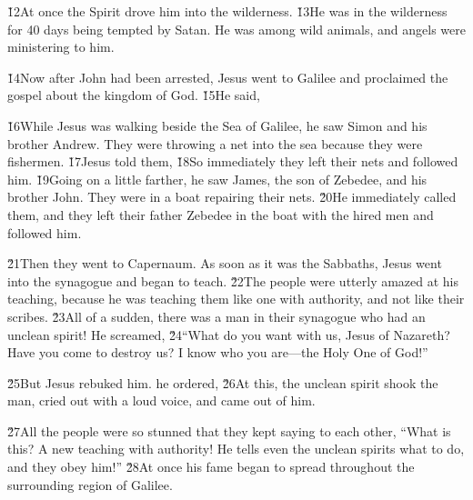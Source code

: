 \v{12}At once the Spirit drove him into the wilderness. \v{13}He was in the wilderness for 40 days being tempted by Satan. He was among wild animals, and angels were ministering to him.

\v{14}Now after John had been arrested, Jesus went to Galilee and proclaimed the gospel about the kingdom of God. \v{15}He said, 

\v{16}While Jesus was walking beside the Sea of Galilee, he saw Simon and his brother Andrew. They were throwing a net into the sea because they were fishermen. \v{17}Jesus told them,  \v{18}So immediately they left their nets and followed him. \v{19}Going on a little farther, he saw James, the son of Zebedee, and his brother John. They were in a boat repairing their nets. \v{20}He immediately called them, and they left their father Zebedee in the boat with the hired men and followed him.

\v{21}Then they went to Capernaum. As soon as it was the Sabbaths, Jesus went into the synagogue and began to teach. \v{22}The people were utterly amazed at his teaching, because he was teaching them like one with authority, and not like their scribes. \v{23}All of a sudden, there was a man in their synagogue who had an unclean spirit! He screamed, \v{24}``What do you want with us, Jesus of Nazareth? Have you come to destroy us? I know who you are---the Holy One of God!''

\v{25}But Jesus rebuked him.  he ordered,  \v{26}At this, the unclean spirit shook the man, cried out with a loud voice, and came out of him.

\v{27}All the people were so stunned that they kept saying to each other, ``What is this? A new teaching with authority! He tells even the unclean spirits what to do, and they obey him!'' \v{28}At once his fame began to spread throughout the surrounding region of Galilee.

